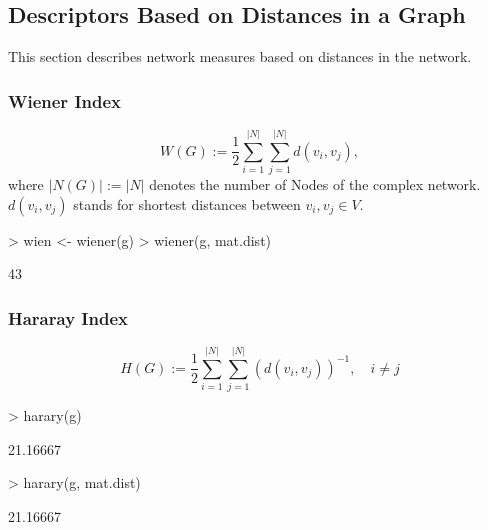\documentclass[a4paper]{article}
\begin{document}
\subsection{Descriptors Based on Distances in a Graph} \label{sec:dist}
This section describes network measures based on distances in the network.
\subsubsection*{ Wiener Index}
\begin{equation}
W(G):= \frac{1}{2} \sum_{i=1}^{|N|}\sum_{j=1}^{|N|}d(v_i,v_j),
\end{equation}
where $|N(G)|:=|N|$ denotes the number of Nodes of the complex network.
$d(v_i,v_j)$ stands for shortest distances between $v_i,v_j \in V$.

\begin{Schunk}
\begin{Sinput}
> wien <- wiener(g)
> wiener(g, mat.dist)
\end{Sinput}
\begin{Soutput}
[1] 43
\end{Soutput}
\end{Schunk}

\subsubsection*{Hararay Index}
\begin{equation}
H(G):= \frac{1}{2} \sum_{i=1}^{|N|}\sum_{j=1}^{|N|}(d(v_i,v_j))^{-1}, \quad i \ne j
\end{equation}
\begin{Schunk}
\begin{Sinput}
> harary(g)
\end{Sinput}
\begin{Soutput}
[1] 21.16667
\end{Soutput}
\begin{Sinput}
> harary(g, mat.dist)
\end{Sinput}
\begin{Soutput}
[1] 21.16667
\end{Soutput}
\end{Schunk}
\end{document}
